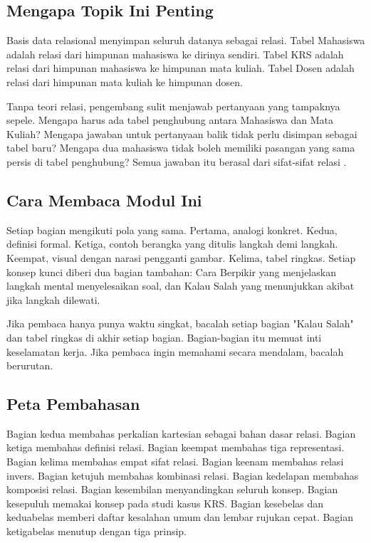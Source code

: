 \documentclass[11pt,a4paper]{article}
\begin{document}
\subsection{Mengapa Topik Ini Penting}

Basis data relasional menyimpan seluruh datanya sebagai relasi. Tabel Mahasiswa adalah relasi dari himpunan mahasiswa ke dirinya sendiri. Tabel KRS adalah relasi dari himpunan mahasiswa ke himpunan mata kuliah. Tabel Dosen adalah relasi dari himpunan mata kuliah ke himpunan dosen.

Tanpa teori relasi, pengembang sulit menjawab pertanyaan yang tampaknya sepele. Mengapa harus ada tabel penghubung antara Mahasiswa dan Mata Kuliah? Mengapa jawaban untuk pertanyaan balik tidak perlu disimpan sebagai tabel baru? Mengapa dua mahasiswa tidak boleh memiliki pasangan yang sama persis di tabel penghubung? Semua jawaban itu berasal dari sifat-sifat relasi \cite{silberschatz}.

\subsection{Cara Membaca Modul Ini}

Setiap bagian mengikuti pola yang sama. Pertama, analogi konkret. Kedua, definisi formal. Ketiga, contoh berangka yang ditulis langkah demi langkah. Keempat, visual dengan narasi pengganti gambar. Kelima, tabel ringkas. Setiap konsep kunci diberi dua bagian tambahan: Cara Berpikir yang menjelaskan langkah mental menyelesaikan soal, dan Kalau Salah yang menunjukkan akibat jika langkah dilewati.

Jika pembaca hanya punya waktu singkat, bacalah setiap bagian "Kalau Salah" dan tabel ringkas di akhir setiap bagian. Bagian-bagian itu memuat inti keselamatan kerja. Jika pembaca ingin memahami secara mendalam, bacalah berurutan.

\subsection{Peta Pembahasan}

Bagian kedua membahas perkalian kartesian sebagai bahan dasar relasi. Bagian ketiga membahas definisi relasi. Bagian keempat membahas tiga representasi. Bagian kelima membahas empat sifat relasi. Bagian keenam membahas relasi invers. Bagian ketujuh membahas kombinasi relasi. Bagian kedelapan membahas komposisi relasi. Bagian kesembilan menyandingkan seluruh konsep. Bagian kesepuluh memakai konsep pada studi kasus KRS. Bagian kesebelas dan keduabelas memberi daftar kesalahan umum dan lembar rujukan cepat. Bagian ketigabelas menutup dengan tiga prinsip.
\end{document}
